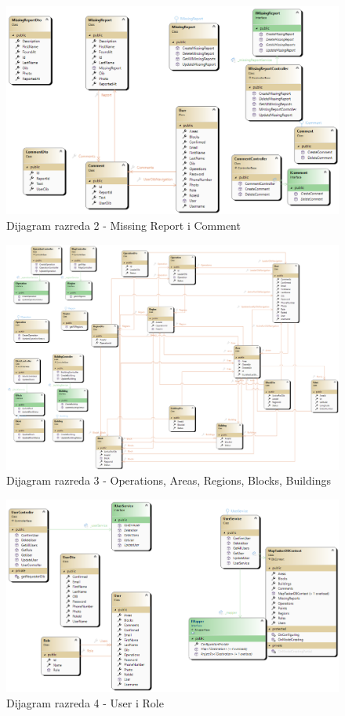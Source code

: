			\begin{figure}[h!] \includegraphics[width=\linewidth]{dijagrami/CD-CommentMissingReport.png}
				\caption{Dijagram razreda 2 - Missing Report i Comment}
			\end{figure}
		
			\begin{figure}[h!] \includegraphics[width=\linewidth]{dijagrami/CD-AreasOperations.png}
				\caption{Dijagram razreda 3 - Operations, Areas, Regions, Blocks, Buildings}
			\end{figure}
		
			\begin{figure}[h!] \includegraphics[width=\linewidth]{dijagrami/CD-UserRole.png}
				\caption{Dijagram razreda 4 - User i Role}
			\end{figure}
		
